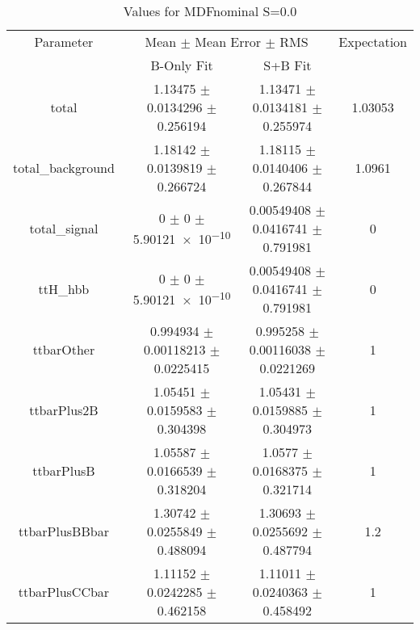 \begin{table}
\centering
\caption{Values for MDFnominal S=0.0}
\begin{tabular}{cccc}
\toprule
Parameter & \multicolumn{2}{c}{Mean $\pm$ Mean Error $\pm$ RMS} & Expectation\\
 & B-Only Fit & S+B Fit & \\
\midrule
total & \num{1.13475} $\pm$ \num{0.0134296} $\pm$ \num{0.256194} & \num{1.13471} $\pm$ \num{0.0134181} $\pm$ \num{0.255974} & \num{1.03053}\\
total\_background & \num{1.18142} $\pm$ \num{0.0139819} $\pm$ \num{0.266724} & \num{1.18115} $\pm$ \num{0.0140406} $\pm$ \num{0.267844} & \num{1.0961}\\
total\_signal & \num{0} $\pm$ \num{0} $\pm$ \num{5.90121e-10} & \num{0.00549408} $\pm$ \num{0.0416741} $\pm$ \num{0.791981} & \num{0}\\
ttH\_hbb & \num{0} $\pm$ \num{0} $\pm$ \num{5.90121e-10} & \num{0.00549408} $\pm$ \num{0.0416741} $\pm$ \num{0.791981} & \num{0}\\
ttbarOther & \num{0.994934} $\pm$ \num{0.00118213} $\pm$ \num{0.0225415} & \num{0.995258} $\pm$ \num{0.00116038} $\pm$ \num{0.0221269} & \num{1}\\
ttbarPlus2B & \num{1.05451} $\pm$ \num{0.0159583} $\pm$ \num{0.304398} & \num{1.05431} $\pm$ \num{0.0159885} $\pm$ \num{0.304973} & \num{1}\\
ttbarPlusB & \num{1.05587} $\pm$ \num{0.0166539} $\pm$ \num{0.318204} & \num{1.0577} $\pm$ \num{0.0168375} $\pm$ \num{0.321714} & \num{1}\\
ttbarPlusBBbar & \num{1.30742} $\pm$ \num{0.0255849} $\pm$ \num{0.488094} & \num{1.30693} $\pm$ \num{0.0255692} $\pm$ \num{0.487794} & \num{1.2}\\
ttbarPlusCCbar & \num{1.11152} $\pm$ \num{0.0242285} $\pm$ \num{0.462158} & \num{1.11011} $\pm$ \num{0.0240363} $\pm$ \num{0.458492} & \num{1}\\
\bottomrule
\end{tabular}
\end{table}